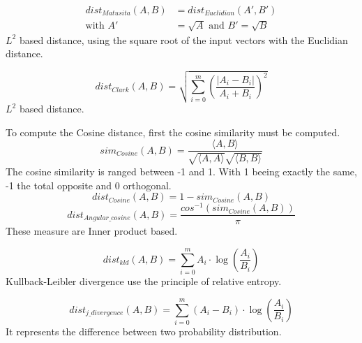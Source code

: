 \begin{definition}
  \begin{equation}
    \begin{split}
      dist_{Matusita}(A, B) &= dist_{Euclidian}(A', B') \\
      \text{with }A' &= \sqrt{A}\text{ and }B' = \sqrt{B}
    \end{split}
  \end{equation}
  $L^2$ based distance, using the square root of the input vectors with the Euclidian distance.
\end{definition}

\begin{definition}
  \begin{equation}
    dist_{Clark}(A, B) = \sqrt{\sum_{i=0}^{m}\left(\frac{|A_i - B_i|}{A_i + B_i}\right)^2}
  \end{equation}
  $L^2$ based distance.
\end{definition}

\begin{definition}
  \label{def:cosine_dist}
  To compute the Cosine distance, first the cosine similarity must be computed.
  \begin{equation}
    sim_{Cosine}(A, B) = \frac{\langle A, B \rangle}{\sqrt{\langle A , A \rangle}\sqrt{\langle B, B \rangle}}
  \end{equation}
  The cosine similarity is ranged between -1 and 1.
  With 1 beeing exactly the same, -1 the total opposite and 0 orthogonal.
  \begin{equation}
    dist_{Cosine}(A, B) = 1 - sim_{Cosine}(A, B)
  \end{equation}
  \begin{equation}
    dist_{Angular\_cosine}(A, B) = \frac{cos^{-1}\left( sim_{Cosine}(A, B) \right)}{\pi}
  \end{equation}
  These measure are Inner product based.
\end{definition}

\begin{definition}
  \begin{equation}
    dist_{kld}(A, B) = \sum_{i=0}^{m} A_i \cdot \log(\frac{A_i}{B_i})
  \end{equation}
  Kullback-Leibler divergence use the principle of relative entropy.
\end{definition}

\begin{definition}
  \begin{equation}
    dist_{j\_divergence}(A, B) = \sum_{i=0}^{m} (A_i - B_i) \cdot \log(\frac{A_i}{B_i})
  \end{equation}
  It represents the difference between two probability distribution.
\end{definition}


